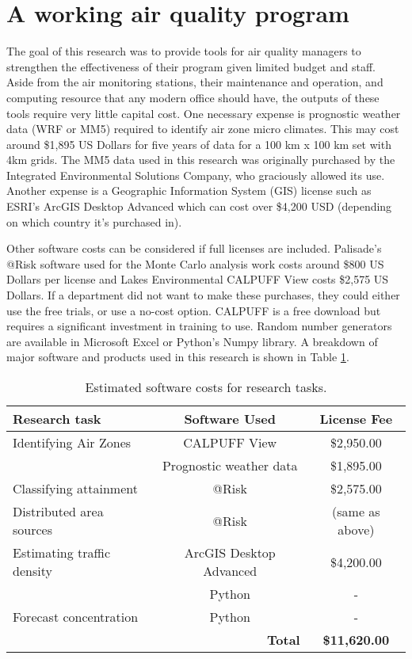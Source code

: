 \section{A working air quality program}

The goal of this research was to provide tools for air quality managers to strengthen the effectiveness of their program given limited budget and staff. Aside from the air monitoring stations, their maintenance and operation, and computing resource that any modern office should have, the outputs of these tools require very little capital cost. One necessary expense is prognostic weather data (WRF or MM5) required to identify air zone micro climates. This may cost around \$1,895 US Dollars for five years of data for a 100 km x 100 km set with 4km grids. The MM5 data used in this research was originally purchased by the Integrated Environmental Solutions Company, who graciously allowed its use. Another expense is a Geographic Information System (GIS) license such as ESRI's ArcGIS Desktop Advanced which can cost over \$4,200 USD (depending on which country it's purchased in).

Other software costs can be considered if full licenses are included. Palisade's @Risk software used for the Monte Carlo analysis work costs around \$800 US Dollars per license and Lakes Environmental CALPUFF View costs \$2,575 US Dollars. If a department did not want to make these purchases, they could either use the free trials, or use a no-cost option. CALPUFF is a free download but requires a significant investment in training to use. Random number generators are available in Microsoft Excel or Python's Numpy library. A breakdown of major software and products used in this research is shown in Table \ref{tb:projcosts}.

\begin{table}[]
\centering
\caption{Estimated software costs for research tasks.}
\label{tb:projcosts}
\begin{tabular}{@{}lcc@{}}
\toprule
\textbf{Research task} & \textbf{Software Used} & \textbf{License Fee} \\ \midrule
Identifying Air Zones & CALPUFF View & \$2,950.00 \\
 & Prognostic weather data & \$1,895.00 \\ \midrule
Classifying attainment & @Risk & \$2,575.00 \\ \midrule
Distributed area sources & @Risk & (same as above) \\ \midrule
Estimating traffic density & ArcGIS Desktop Advanced & \$4,200.00 \\
 & Python & - \\ \midrule
Forecast concentration & Python & - \\
 & \multicolumn{1}{r}{\textbf{Total}} & \textbf{\$11,620.00} \\ \bottomrule
\end{tabular}
\end{table}